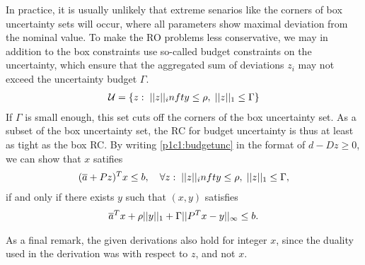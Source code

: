 In practice, it is usually unlikely that extreme senarios like the corners of box uncertainty sets will occur, where all parameters show maximal deviation from the nominal value. To make the RO problems less conservative, we may in addition to the box constraints use so-called budget constraints on the uncertainty, which ensure that the aggregated sum of deviations $z_i$ may not exceed the uncertainty budget $\Gamma$.
\begin{align}\label{p1c1:budgetunc}
\mathcal{U} = \{z:\;\vert\vert z \vert\vert_infty\leq\rho,\;\vert\vert z \vert\vert_1\leq\Gamma\}
\end{align}
If $\Gamma$ is small enough, this set cuts off the corners of the box uncertainty set. As a subset of the box uncertainty set, the RC for budget uncertainty is thus at least as tight as the box RC. By writing \eqref{p1c1:budgetunc} in the format of $d-Dz\geq 0$, we can show that $x$ satifies
\begin{align*}
(\overline{ a }+Pz)^Tx\leq b,\quad \forall z:\;\vert\vert z \vert\vert_infty\leq\rho,\;\vert\vert z \vert\vert_1\leq\Gamma,
\end{align*}
if and only if there exists $y$ such that $(x,y)$ satisfies
\begin{align*}
\overline{ a }^Tx+\rho\vert\vert y \vert\vert_1+\Gamma\vert\vert P^Tx-y \vert\vert_\infty\leq b.
\end{align*}

As a final remark, the given derivations also hold for integer $x$, since the duality used in the derivation was with respect to $z$, and not $x$.